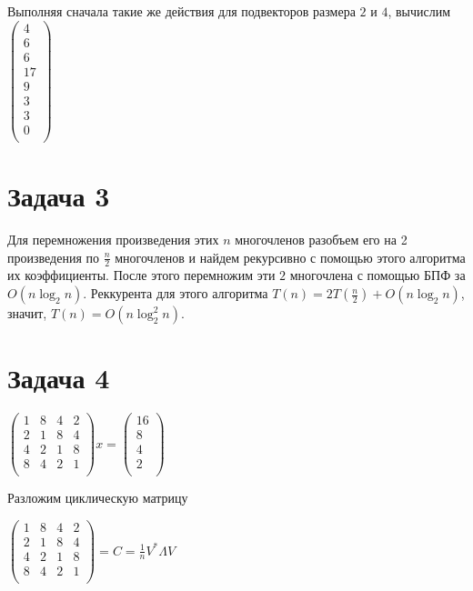 \documentclass[a4paper,12pt]{article} %
\begin{document}
Выполняя сначала такие же действия для подвекторов размера $2$ и $4$, вычислим  $\begin{pmatrix}
4\\  6\\ 6\\ 17\\ 9\\  3\\ 3\\ 0\\
\end{pmatrix}$



\section{Задача 3}
\hspace{5mm}
Для перемножения произведения этих $n$ многочленов разобъем его на 2 произведения по $\frac{n}{2}$ многочленов и найдем рекурсивно с помощью этого алгоритма их коэффициенты. После этого перемножим эти $2$ многочлена с помощью БПФ за $O(n\log_2 n)$. Реккурента для этого алгоритма $T(n)=2T(\frac{n}{2})+O(n\log_2 n)$, значит, $T(n)=O(n\log_2^2 n)$.

\section{Задача 4}
\hspace{5mm}
$\begin{pmatrix}
1 & 8 & 4 & 2 \\
2 & 1 & 8 & 4 \\
4 & 2 & 1 & 8 \\
8 & 4 & 2 & 1 \\
\end{pmatrix}x=
\begin{pmatrix}
16 \\
8 \\
4 \\
2 \\
\end{pmatrix}$

Разложим циклическую матрицу

$\begin{pmatrix}
1 & 8 & 4 & 2 \\
2 & 1 & 8 & 4 \\
4 & 2 & 1 & 8 \\
8 & 4 & 2 & 1 \\
\end{pmatrix}=C=\frac{1}{n}V^*\Lambda V$
\end{document}
